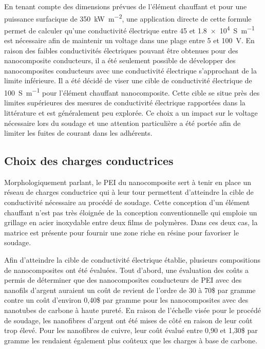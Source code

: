 En tenant compte des dimensions prévues de l'élément chauffant et pour une puissance surfacique de \SI[locale=FR]{350}{\kilo\watt\per\square\metre}, une application directe de cette formule permet de calculer qu'une conductivité électrique entre 45 et \SI[locale=FR]{1,8e4}{\siemens\per\metre} est nécessaire afin de maintenir un voltage dans une plage entre 5 et \SI[locale=FR]{100}{\volt}. 
En raison des faibles conductivités électriques pouvant être obtenues pour des nanocomposite conducteurs, il a été seulement possible de développer des nanocomposites conducteurs avec une conductivité électrique s'approchant de la limite inférieure. 
Il a été décidé de viser une cible de conductivité électrique de \SI[locale=FR]{100}{\siemens\per\metre} pour l'élément chauffant nanocomposite. 
Cette cible se situe près des limites supérieures des mesures de conductivité électrique rapportées dans la littérature et est généralement peu explorée. 
Ce choix a un impact sur le voltage nécessaire lors du soudage et une attention particulière a été portée afin de limiter les fuites de courant dans les adhérents. 

\subsection{Choix des charges conductrices}

Morphologiquement parlant, le PEI du nanocomposite sert à tenir en place un réseau de charges conductrice qui à leur tour permettent d'atteindre la cible de conductivité nécessaire au procédé de soudage. 
Cette conception d'un élément chauffant n'est pas très éloignée de la conception conventionnelle qui emploie un grillage en acier inoxydable entre deux films de polymères. 
Dans ces deux cas, la matrice est présente pour fournir une zone riche en résine pour favoriser le soudage. 

Afin d'atteindre la cible de conductivité électrique établie, plusieurs compositions de nanocomposites ont été évaluées. 
Tout d'abord, une évaluation des coûts a permis de déterminer que des nanocomposites conducteurs de PEI avec des nanofils d'argent auraient un coût de revient de l'ordre de 30 à 70\$ par gramme contre un coût d'environ 0,40\$ par gramme pour les nanocomposites avec des nanotubes de carbone à haute pureté. 
En raison de l'échelle visée pour le procédé de soudage, les nanofibres d'argent ont été mises de côté en raison de leur coût trop élevé. 
Pour les nanofibres de cuivre, leur coût évalué entre 0,90 et 1,30\$ par gramme les rendaient également plus coûteux que les charges à base de carbone. 

